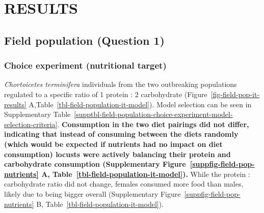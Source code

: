 \documentclass[
]{article}
\begin{document}
\section{RESULTS}\label{results}

\subsection{Field population (Question
1)}\label{field-population-question-1}

\subsubsection{Choice experiment (nutritional
target)}\label{choice-experiment-nutritional-target}

\emph{Chortoicetes terminifera} individuals from the two outbreaking
populations regulated to a specific ratio of 1 protein : 2 carbohydrate
(Figure~\ref{fig-field-pop-it-results}
A,Table~\ref{tbl-field-population-it-model}). Model selection can be
seen in
Supplementary Table~\ref{supptbl-field-population-choice-experiment-model-selection-criteria}.
\textbf{Consumption in the two diet pairings did not differ, indicating
that instead of consuming between the diets randomly (which would be
expected if nutrients had no impact on diet consumption) locusts were
actively balancing their protein and carbohydrate consumption
(Supplementary Figure~\ref{suppfig-field-pop-nutrients} A,
Table~\ref{tbl-field-population-it-model}).} While the protein :
carbohydrate ratio did not change, females consumed more food than
males, likely due to being bigger overall
(Supplementary Figure~\ref{suppfig-field-pop-nutrients} B,
Table~\ref{tbl-field-population-it-model}).

\begingroup
\fontsize{12.0pt}{14.4pt}\selectfont
\end{document}
